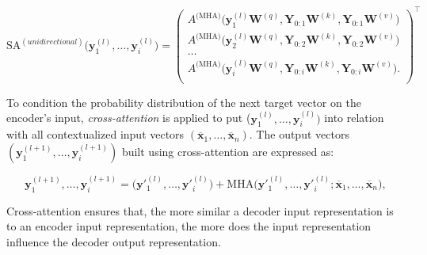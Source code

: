 \begin{equation}
    \textrm{SA}^{(unidirectional)}\bigl(\bm{y}^{(l)}_1, \ldots, \bm{y}^{(l)}_i\bigr) =
    {\begin{pmatrix}
        A^{\textrm{(MHA)}}\bigl(\bm{y}^{(l)}_1 \bm{W}^{(q)}, \bm{Y}_{0:1}\bm{W}^{(k)}, \bm{Y}_{0:1}\bm{W}^{(v)}\bigr)\\ 
        A^{\textrm{(MHA)}}\bigl(\bm{y}^{(l)}_2 \bm{W}^{(q)}, \bm{Y}_{0:2}\bm{W}^{(k)}, \bm{Y}_{0:2}\bm{W}^{(v)}\bigr)\\ 
        \ldots \\
        A^{\textrm{(MHA)}}\bigl(\bm{y}^{(l)}_i \bm{W}^{(q)}, \bm{Y}_{0:i}\bm{W}^{(k)}, \bm{Y}_{0:i}\bm{W}^{(v)}\bigr). \\
    \end{pmatrix}}^{\top}
\end{equation}



To condition the probability distribution of the next target vector on the encoder's input, \textit{cross-attention} is applied to put ($\bm{y}^{(l)}_1, \ldots, \bm{y}^{(l)}_i)$ into relation with all contextualized input vectors $(\overline{\bm{x}}_1, \ldots, \overline{\bm{x}}_n)$. The output vectors $(\bm{y}^{(l+1)}_1, \ldots, \bm{y}^{(l+1)}_i)$ built using cross-attention are expressed as:

\begin{equation}
    \bm{y}^{(l+1)}_1, \ldots, \bm{y}^{(l+1)}_{i} = \bigl(\bm{y}'^{(l)}_1, \ldots, \bm{y}'^{(l)}_{i}\bigr) + \textrm{MHA}\bigl(\bm{y}'^{(l)}_1, \ldots, \bm{y}'^{(l)}_{i}; \overline{\bm{x}}_1, \ldots, \overline{\bm{x}}_n\bigr),
\end{equation}



\noindent Cross-attention ensures that, the more similar a decoder input representation is to an encoder input representation, the more does the input representation influence the decoder output representation.

